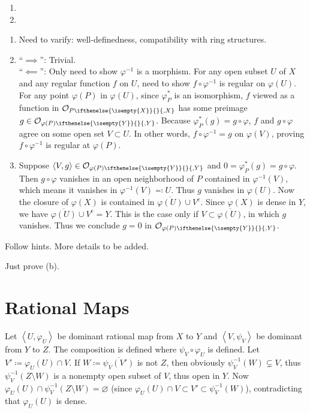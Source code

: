 \documentclass{note}
\newcommand{\lring}[2][]{\mathcal{O}_{#2\ifthenelse{\isempty{#1}}{}{,#1}}}
\newcommand{\union}{\cup}
\newcommand{\closure}{\overline}
\newcommand{\cmpl}[1]{#1^\text{c}}
\newcommand{\chevrons}[1]{\left\langle#1\right\rangle}
\newcommand{\rational}[2]{\chevrons{#1,#2}}
\begin{document}
\begin{enumerate}
\item
\item 
\end{enumerate}


\begin{enumerate}
\item Need to varify: well-definedness, compatibility with ring
  structures.
\item
  ``$\implies$'': Trivial.\\
  ``$\impliedby$'': Only need to show $\varphi^{-1}$ is a
  morphism. For any open subset $U$ of $X$ and any regular function
  $f$ on $U$, need to show $f\circ\varphi^{-1}$ is regular on
  $\varphi(U)$. For any point $\varphi(P)$ in $\varphi(U)$, since
  $\varphi_P^*$ is an isomorphism, $f$ viewed as a function in
  $\lring[X]{P}$ has some preimage
  $g\in\lring[Y]{\varphi(P)}$. Because
  $\varphi_P^*(g) = g\circ\varphi$, $f$ and $g\circ\varphi$ agree on
  some open set $V\subset U$. In other words, $f\circ\varphi^{-1} = g$ on
  $\varphi(V)$, proving $f\circ\varphi^{-1}$ is regular at
  $\varphi(P)$.
\item Suppose $\chevrons{V,g}\in\lring[Y]{\varphi(P)}$ and
  $0 = \varphi_P^*(g) = g\circ\varphi$. Then $g\circ\varphi$ vanishes
  in an open neighborhood of $P$ contained in $\varphi^{-1}(V)$, which
  means it vanishes in $\varphi^{-1}(V)\eqqcolon U$. Thus $g$ vanishes
  in $\varphi(U)$. Now the closure of $\varphi(X)$ is contained in
  $\closure{\varphi(U)}\union\cmpl{V}$. Since $\varphi(X)$ is dense in
  $Y$, we have $\closure{\varphi(U)}\union\cmpl{V} = Y$. This is the
  case only if $V\subset\closure{\varphi(U)}$, in which $g$
  vanishes. Thus we conclude $g = 0$ in $\lring[Y]{\varphi(P)}$.
\end{enumerate}

Follow hints. More details to be added.

Just prove (b).

\section{Rational Maps}
Let $\rational{U}{\varphi_U}$ be dominant rational map from $X$ to $Y$
and $\rational{V}{\psi_V}$ be dominant from $Y$ to $Z$. The
composition is defined where $\psi_V\circ\varphi_U$ is defined. Let
$V'\coloneqq\varphi_U(U)\cap V$. If $W\coloneqq\closure{\psi_V(V')}$
is not $Z$, then obviously $\psi_V^{-1}(W) \subsetneq V$, thus
$\psi_V^{-1}(Z\setminus W)$ is a nonempty open subset of $V$, thus
open in $Y$. Now
$\varphi_U(U) \cap \psi_V^{-1}(Z\setminus W) = \varnothing$ (since
$\varphi_U(U) \cap V \subset V' \subset \psi_V^{-1}(W)$),
contradicting that $\varphi_U(U)$ is dense.
\end{document}
